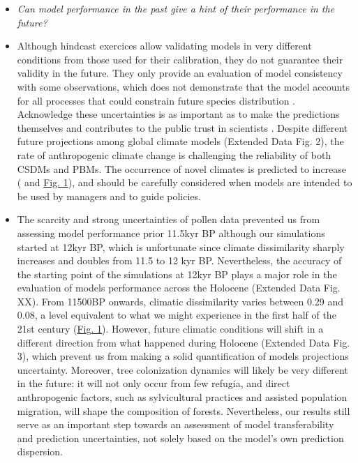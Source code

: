 \documentclass[pdflatex, sn-nature]{sn-jnl}%
\begin{document}
\begin{itemize}
\item \emph{Can model performance in the past give a hint of their performance in the future?}\par
\item Although hindcast exercices allow validating models in very different conditions from those used for their calibration, they do not guarantee their validity in the future. They only provide an evaluation of model consistency with some observations, which does not demonstrate that the model accounts for all processes that could constrain future species distribution \cite{Oreskes1994}. Acknowledge these uncertainties is as important as to make the predictions themselves \cite{Beale2012} and contributes to the public trust in scientists \cite{Berkhout2010}. Despite different future projections among global climate models (Extended Data Fig. 2), the rate of anthropogenic climate change is challenging the reliability of both CSDMs and PBMs. The occurrence of novel climates is predicted to increase (\cite{Williams2007} and \hyperref[climatic_dissimilarity]{Fig. 1}), and should be carefully considered when models are intended to be used by managers and to guide policies.
\item The scarcity and strong uncertainties of pollen data prevented us from assessing model performance prior 11.5kyr BP although our simulations started at 12kyr BP, which is unfortunate since climate dissimilarity sharply increases and doubles from 11.5 to 12 kyr BP. Nevertheless, the accuracy of the starting point of the simulations at 12kyr BP plays a major role in the evaluation of models performance across the Holocene (Extended Data Fig. XX).  From 11500BP onwards, climatic dissimilarity varies between 0.29 and 0.08, a level equivalent to what we might experience in the first half of the 21st century (\hyperref[climatic_dissimilarity]{Fig. 1}). However, future climatic conditions will shift in a different direction from what happened during Holocene (Extended Data Fig. 3), which prevent us from making a solid quantification of models projections uncertainty. Moreover, tree colonization dynamics will likely be very different in the future: it will not only occur from few refugia, and direct anthropogenic factors, such as sylvicultural practices and assisted population migration, will shape the composition of forests. Nevertheless, our results still serve as an important step towards an assessment of model transferability and prediction uncertainties, not solely based on the model's own prediction dispersion. 


\end{itemize}
\end{document}
